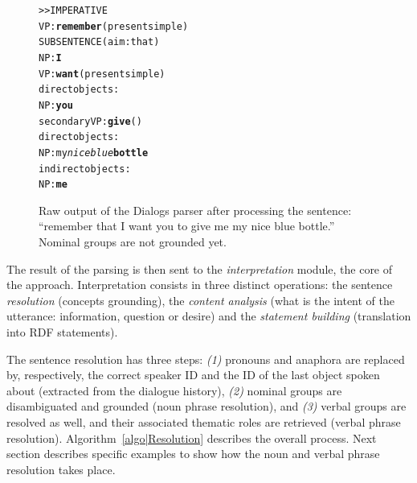 \begin{figure}%
\begin{center}
\scriptsize
\begin{alltt}
>> IMPERATIVE
VP: \textbf{remember} (present simple)
    SUBSENTENCE (aim: that)
      NP: \textbf{I}
      VP: \textbf{want} (present simple)
        direct objects: 
          NP: \textbf{you}
        secondary VP: \textbf{give} ()
              direct objects:
                NP: my \emph{nice blue} \textbf{bottle}
              indirect objects:
                NP: \textbf{me}
\end{alltt}
\end{center}
\caption{Raw output of the {\sc Dialogs} parser after processing the
sentence: ``remember that I want you to give me my nice blue bottle.'' 
Nominal groups are not grounded yet.} 
\label{dialog|parser_output}
\end{figure}

The result of the parsing is then sent to the \emph{interpretation} module, the
core of the approach.  Interpretation consists in three distinct operations:
the sentence \emph{resolution} (concepts grounding), the \emph{content
analysis} (what is the intent of the utterance: information, question or
desire) and the \emph{statement building} (translation into RDF statements).

The sentence resolution has three steps: {\it(1)} pronouns and anaphora are
replaced by, respectively, the correct speaker ID and the ID of the last object
spoken about (extracted from the dialogue history), {\it(2)} nominal groups are
disambiguated and grounded (noun phrase resolution), and {\it(3)} verbal groups
are resolved as well, and their associated thematic roles are retrieved (verbal
phrase resolution). Algorithm~\ref{algo|Resolution} describes the overall
process.  Next section describes specific examples to show how the noun and
verbal phrase resolution takes place.

